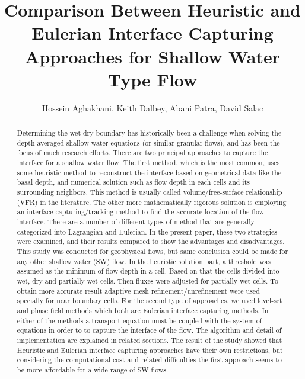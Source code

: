 \documentclass[letterpaper,10pt]{article}
\title{Comparison Between Heuristic and Eulerian Interface Capturing Approaches for Shallow Water Type Flow}
\author{Hossein Aghakhani, Keith Dalbey, Abani Patra, David Salac}
\date{}
\begin{document}
\maketitle

\begin {abstract}{
Determining the wet-dry boundary has historically been a challenge when 
solving the depth-averaged shallow-water equations (or similar granular flows), and has 
been the focus of much research efforts.
There are two principal approaches to capture the interface for a shallow water flow. The first method, 
which is the most common, uses some heuristic method to reconstruct the interface 
based on geometrical data like the basal depth, and numerical solution such as flow depth in each 
cells and its surrounding neighbors. This method is usually called volume/free-surface relationship (VFR)
in the literature.
The other more mathematically rigorous solution is employing an interface capturing/tracking 
method to find the accurate location of the flow interface. There are a number of different types 
of method that are generally categorized into Lagrangian and Eulerian.
In the present paper, these two strategies were examined, and their results compared to show the advantages and disadvantages. 
This study was conducted for geophysical flows, but same conclusion could be made for 
any other shallow water (SW) flow.\newline
In the heuristic solution part, a threshold was assumed as the minimum of flow depth in a cell.
Based on that the cells divided into wet, dry and partially wet cells. Then fluxes were adjusted for partially
wet cells. To obtain more accurate result adaptive mesh refinement/unrefinement were used specially for near boundary 
cells.
For the second type of approaches, we used level-set and phase field methods which both are Eulerian interface capturing 
methods. In either of the methods a transport equation must be coupled with the system of equations in order to 
to capture the interface of the flow. The algorithm and detail of implementation are explained in related sections.
The result of the study showed that Heuristic and Eulerian interface capturing approaches have their own restrictions, 
but considering the computational cost and related difficulties the first approach seems to be more affordable for a 
wide range of SW flows.
}
\end{abstract}
\end{document}
